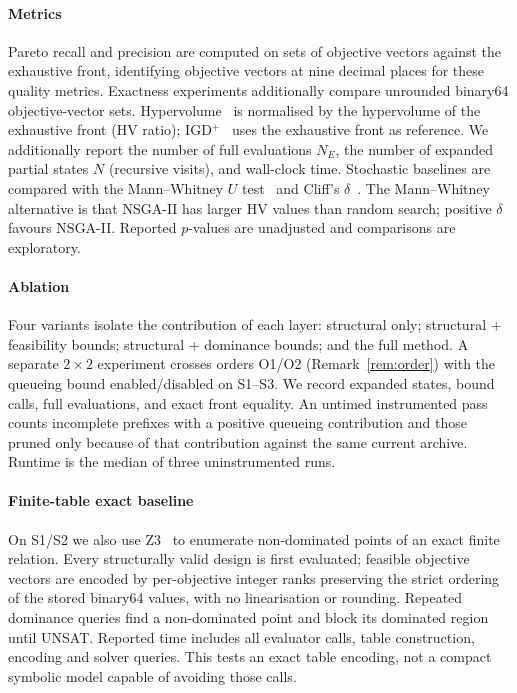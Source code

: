 \paragraph{Metrics}
Pareto recall and precision are computed on sets of objective vectors against the
exhaustive front, identifying objective vectors at nine decimal places for these quality metrics. Exactness experiments additionally compare unrounded binary64 objective-vector sets. Hypervolume~\cite{zitzler1999hv} is normalised by the hypervolume of the
exhaustive front (HV ratio); IGD$^{+}$~\cite{ishibuchi2015igdplus} uses the exhaustive
front as reference. We additionally report the number of full evaluations $N_E$, the
number of expanded partial states $N$ (recursive visits), and wall-clock time. Stochastic baselines are
compared with the Mann--Whitney $U$ test~\cite{mann1947whitney} and Cliff's
$\delta$~\cite{cliff1993delta}. The Mann--Whitney alternative is that
NSGA-II has larger HV values than random search; positive $\delta$ favours
NSGA-II. Reported $p$-values are unadjusted and comparisons are exploratory.

\paragraph{Ablation}
Four variants isolate the contribution of each layer: structural only; structural +
feasibility bounds; structural + dominance bounds; and the full method. A separate
$2\times2$ experiment crosses orders O1/O2 (Remark~\ref{rem:order}) with the queueing
bound enabled/disabled on S1--S3. We record expanded states, bound calls, full evaluations,
and exact front equality. An untimed instrumented pass counts incomplete prefixes with a
positive queueing contribution and those pruned only because of that contribution against
the same current archive. Runtime is the median of three uninstrumented runs.

\paragraph{Finite-table exact baseline}
On S1/S2 we also use Z3~\cite{demoura2008z3} to enumerate non-dominated points of an exact
finite relation. Every structurally valid design is first evaluated; feasible objective
vectors are encoded by per-objective integer ranks preserving the strict ordering of the
stored binary64 values, with no linearisation or rounding. Repeated dominance queries
find a non-dominated point and block its dominated region until UNSAT. Reported time
includes all evaluator calls, table construction, encoding and solver queries. This tests
an exact table encoding, not a compact symbolic model capable of avoiding those calls.


